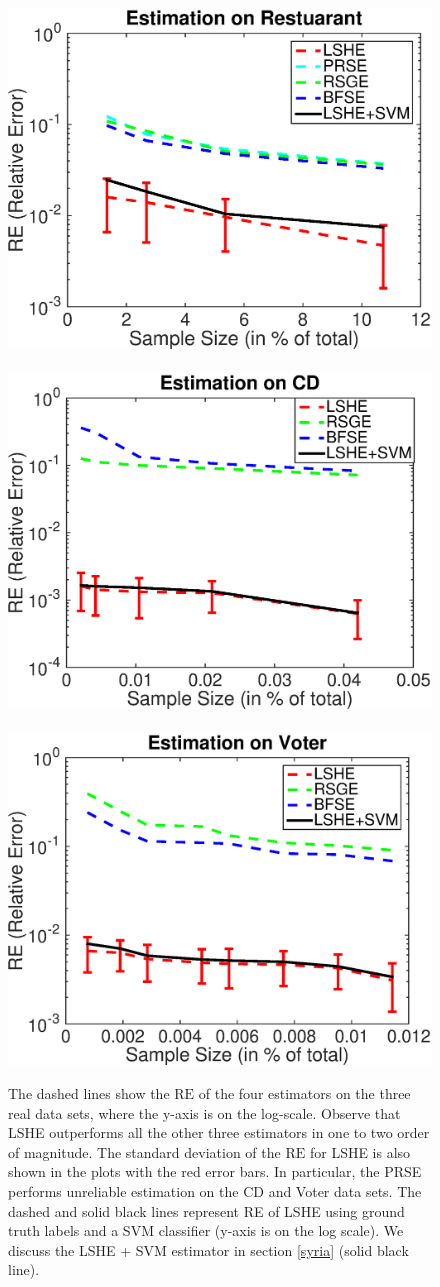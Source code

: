 \documentclass[aoas]{imsart}
\begin{document}
\begin{figure}[H]
	\mbox{
		\hspace{-0.1in}
		\includegraphics[width=.36\linewidth]{fig/restaurant.eps}\hspace{-0.18in}
		\includegraphics[width=.36\linewidth]{fig/cd.eps}\hspace{-0.16in}
		\includegraphics[width=.36\linewidth]{fig/voter.eps}}
	\caption{ The dashed lines show the $\text{RE}$ of the four estimators on the three real data sets, where the y-axis is on the log-scale. Observe that LSHE outperforms all the other three estimators in one to two order of magnitude. The standard deviation of the $\text{RE}$ for LSHE is also shown in the plots with the red error bars.  In particular, the PRSE performs unreliable estimation on the CD and Voter data sets. The dashed and solid black lines represent RE of LSHE using ground truth labels and a SVM classifier (y-axis is on the log scale). We discuss the LSHE + SVM estimator in section \ref{syria} (solid black line).}
	\label{fg1}
\end{figure}
\end{document}
